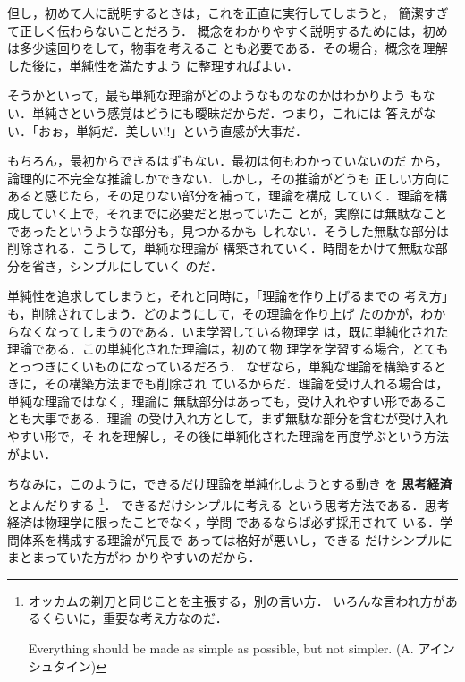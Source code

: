             但し，初めて人に説明するときは，これを正直に実行してしまうと，
            簡潔すぎて正しく伝わらないことだろう．
            概念をわかりやすく説明するためには，初めは多少遠回りをして，物事を考えるこ
            とも必要である．その場合，概念を理解した後に，単純性を満たすよう
            に整理すればよい．

            そうかといって，最も単純な理論がどのようなものなのかはわかりよう
            もない．単純さという感覚はどうにも曖昧だからだ．つまり，これには
            答えがない．「おぉ，単純だ．美しい!!」という直感が大事だ．

            もちろん，最初からできるはずもない．最初は何もわかっていないのだ
            から，論理的に不完全な推論しかできない．しかし，その推論がどうも
            正しい方向にあると感じたら，その足りない部分を補って，理論を構成
            していく．理論を構成していく上で，それまでに必要だと思っていたこ
            とが，実際には無駄なことであったというような部分も，見つかるかも
            しれない．そうした無駄な部分は削除される．こうして，単純な理論が
            構築されていく．時間をかけて無駄な部分を省き，シンプルにしていく
            のだ．

            単純性を追求してしまうと，それと同時に，「理論を作り上げるまでの
            考え方」も，削除されてしまう．どのようにして，その理論を作り上げ
            たのかが，わからなくなってしまうのである．いま学習している物理学
            は，既に単純化された理論である．この単純化された理論は，初めて物
            理学を学習する場合，とてもとっつきにくいものになっているだろう．
            なぜなら，単純な理論を構築するときに，その構築方法までも削除され
            ているからだ．理論を受け入れる場合は，単純な理論ではなく，理論に
            無駄部分はあっても，受け入れやすい形であることも大事である．理論
            の受け入れ方として，まず無駄な部分を含むが受け入れやすい形で，そ
            れを理解し，その後に単純化された理論を再度学ぶという方法がよい．

            ちなみに，このように，できるだけ理論を単純化しようとする動き
            を \textbf{思考経済} とよんだりする
                \footnote{
                    オッカムの剃刀と同じことを主張する，別の言い方．
                    いろんな言われ方があるくらいに，重要な考え方なのだ．

                    Everything should be made as simple as possible, but not simpler.
                    (A. アインシュタイン)
                }．
            できるだけシンプルに考える
            という思考方法である．思考経済は物理学に限ったことでなく，学問
            であるならば必ず採用されて いる．学問体系を構成する理論が冗長で
            あっては格好が悪いし，できる だけシンプルにまとまっていた方がわ
            かりやすいのだから．

